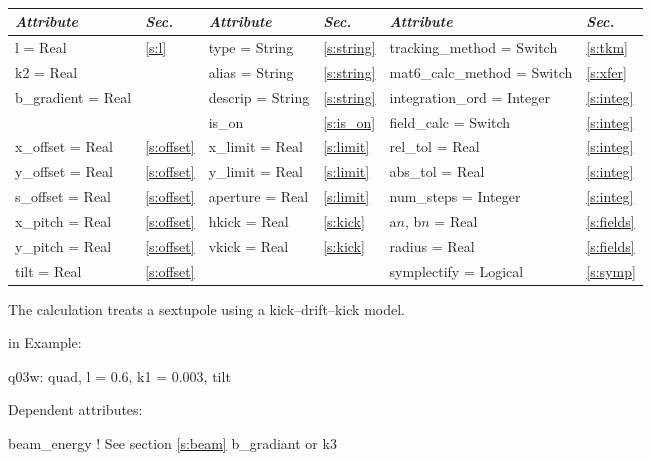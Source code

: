 \toffset
\begin{center}
\tt
\begin{tabular}{|l|l||l|l||l|l|} \hline
  {\sl Attribute} & {\sl Sec.}  & {\sl Attribute} & {\sl Sec.} & {\sl Attribute} & {\sl Sec.} \\ \hline
  l        = Real       & \ref{s:l}      & type = String      & \ref{s:string} & tracking\_method = Switch   & \ref{s:tkm}   \\ \hline
  k2       = Real       &                & alias = String     & \ref{s:string} & mat6\_calc\_method = Switch & \ref{s:xfer}  \\ \hline
  b\_gradient = Real    &                & descrip = String   & \ref{s:string} & integration\_ord = Integer  & \ref{s:integ} \\ \hline
                        &                & is\_on             & \ref{s:is_on}  & field\_calc = Switch        & \ref{s:integ} \\ \hline
  x\_offset  = Real     & \ref{s:offset} & x\_limit = Real    & \ref{s:limit}  & rel\_tol = Real             & \ref{s:integ} \\ \hline
  y\_offset  = Real     & \ref{s:offset} & y\_limit = Real    & \ref{s:limit}  & abs\_tol = Real             & \ref{s:integ} \\ \hline
  s\_offset  = Real     & \ref{s:offset} & aperture = Real    & \ref{s:limit}  & num\_steps = Integer        & \ref{s:integ} \\ \hline
  x\_pitch = Real       & \ref{s:offset} & hkick    = Real    & \ref{s:kick}   & a$n$, b$n$ = Real           & \ref{s:fields}\\ \hline
  y\_pitch = Real       & \ref{s:offset} & vkick    = Real    & \ref{s:kick}   & radius = Real               & \ref{s:fields}\\ \hline
  tilt     = Real       & \ref{s:offset} &                    &                & symplectify = Logical       & \ref{s:symp}  \\ \hline
\end{tabular}
\end{center}
\toffset

The  calculation treats a sextupole using a kick--drift--kick model.

 in \noindent
Example:
\begin{example}
  q03w: quad, l = 0.6, k1 = 0.003, tilt
\end{example}

\vskip0.05in \noindent
Dependent attributes:
\begin{example}
  beam\_energy  ! See section \ref{s:beam}
  b\_gradiant or k3
\end{example}


